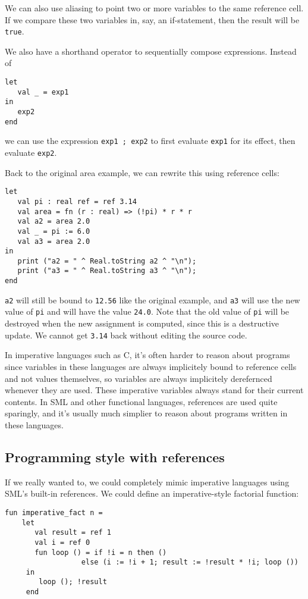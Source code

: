 \documentclass[11pt]{article}
\begin{document}
We can also use aliasing to point two or more variables to the same reference cell. If we compare these two variables in, say, an if-statement, then the result will be \verb~true~.

We also have a shorthand operator to sequentially compose expressions. Instead of

\begin{verbatim}
let
   val _ = exp1
in
   exp2
end
\end{verbatim}

we can use the expression \verb~exp1 ; exp2~ to first evaluate \verb~exp1~ for its effect, then evaluate \verb~exp2~.

Back to the original area example, we can rewrite this using reference cells:

\begin{verbatim}
let
   val pi : real ref = ref 3.14
   val area = fn (r : real) => (!pi) * r * r
   val a2 = area 2.0
   val _ = pi := 6.0
   val a3 = area 2.0
in
   print ("a2 = " ^ Real.toString a2 ^ "\n");
   print ("a3 = " ^ Real.toString a3 ^ "\n");
end
\end{verbatim}

\verb~a2~ will still be bound to \verb~12.56~ like the original example, and \verb~a3~ will use the new value of \verb~pi~ and will have the value \verb~24.0~. Note that the old value of \verb~pi~ will be destroyed when the new assignment is computed, since this is a destructive update. We cannot get \verb~3.14~ back without editing the source code.

In imperative languages such as C, it's often harder to reason about programs since variables in these languages are always implicitely bound to reference cells and not values themselves, so variables are always implicitely derefernced whenever they are used. These imperative variables always stand for their current contents. In SML and other functional languages, references are used quite sparingly, and it's usually much simplier to reason about programs written in these languages.

\subsection{Programming style with references}

If we really wanted to, we could completely mimic imperative languages using SML's built-in references. We could define an imperative-style factorial function:

\begin{verbatim}
fun imperative_fact n =
    let
       val result = ref 1
       val i = ref 0
       fun loop () = if !i = n then ()
                  else (i := !i + 1; result := !result * !i; loop ())
     in
        loop (); !result
	 end
\end{verbatim}
\end{document}
